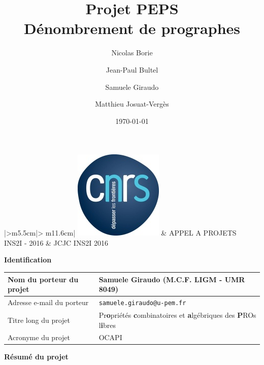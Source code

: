 \documentclass[10pt,reqno]{amsart}
\title{Projet PEPS \\
Dénombrement de prographes}
\date{\today}
\author{Nicolas Borie}
\author{Jean-Paul Bultel}
\author{Samuele Giraudo}
\author{Matthieu Josuat-Vergès}
\numberwithin{equation}{subsection}
\begin{document}

\begin{tabular}{|>{\centering\arraybackslash}m{5.5cm}|>
    {\centering\arraybackslash}m{11.6cm}|} \hline
    \includegraphics{logo_CNRS.jpg} & \Large{APPEL A PROJETS} \\
    INS2I - 2016 & \Large{JCJC INS2I 2016} \\ \hline
\end{tabular}
\bigskip

\Large{\bf{Identification}}

\begin{tabular}{|m{5.5cm}|m{11.6cm}|} \hline
    Nom du porteur du projet & Samuele Giraudo (M.C.F. LIGM - UMR 8049)
        \\ \hline
    Adresse e-mail du porteur & {\tt samuele.giraudo@u-pem.fr} \\ \hline
    Titre long du projet & Pr{\bf o}priétés {\bf c}ombinatoires et
    {\bf a}lgébriques des {\bf P}ROs l{\bf i}bres\\ \hline
    Acronyme du projet & OCAPI \\ \hline
\end{tabular}
\bigskip

\Large{\bf{Résumé du projet}}
\end{document}
